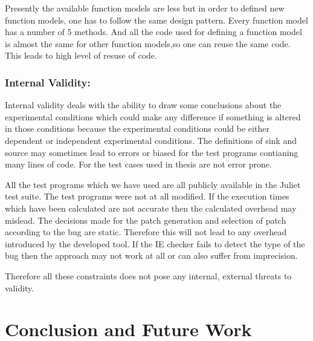 Presently the available function models are less but in order to defined new
function models, one has to follow the same design pattern. Every
function model has a number of 5 methods. And all the code used for defining
a function model is almost the same for other function models,so one can reuse the 
same code. This leads to high level of resuse of code.

\subsection{Internal Validity:}
Internal validity deals with the ability to draw some conclusions about
the experimental conditions which could make any difference if something is
altered in those conditions because the experimental conditions could be either
dependent or independent experimental conditions. The definitions of sink and source
may sometimes lead to errors or biased for the test programs contianing many lines
of code. For the test cases used in thesis are not error prone.

All the test programs which we have used are all publicly available in the
Juliet test suite. The test programs were not at all modified. If the execution
times which have been calculated are not accurate then the calculated overhead
may mislead. The decisions made for the patch generation and selection of
patch according to the bug are static. Therefore this will not lead to any overhead
introduced by the developed tool. If the IE checker fails to detect the type of the
bug then the approach may not work at all or can also suffer from imprecision.

Therefore all these constraints does not pose any internal, external threats
to validity.


\chapter{Conclusion and Future Work}
\label{chapter:Conclusion}

